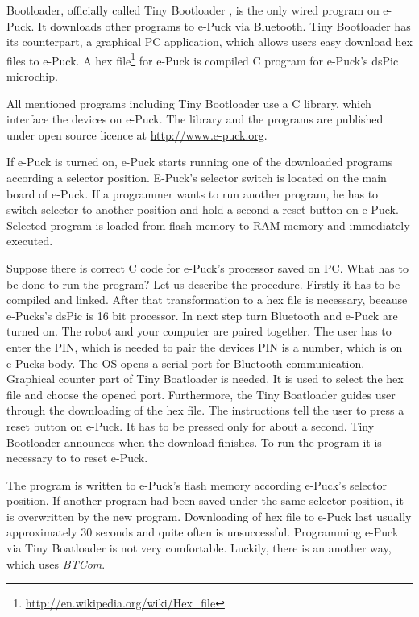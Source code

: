 	Bootloader, officially called Tiny Bootloader\cite{tiny}
	, is the only wired program on e-Puck. It downloads	other programs to e-Puck via Bluetooth. 
	Tiny Bootloader has its counterpart, a graphical PC application,
	which allows users easy download hex files to e-Puck.
	A hex file\footnote{\small{\url{http://en.wikipedia.org/wiki/Hex_file}}} 
	for e-Puck is compiled C program for e-Puck's dsPic microchip. 
	 
	All mentioned programs including Tiny Bootloader use a C library, which interface the devices on e-Puck. 
	The library and the programs are published under open source licence at
	\url{http://www.e-puck.org}.

	 
	If e-Puck is turned on, e-Puck starts running one of the downloaded programs according a selector 
	position. E-Puck's selector switch is located on the main board of e-Puck.
	If a programmer wants to run another program, he has to switch selector to another position
	and hold a second a reset button on e-Puck.	Selected program is loaded from flash memory
	to RAM memory and immediately executed.	
	 
	Suppose there is correct C code for e-Puck's processor saved on PC. What has to be done to run the program?
	Let us describe the procedure.
	Firstly it has to be compiled and linked. After that transformation to a hex file is necessary,
	because e-Pucks's dsPic is 16 bit processor. In next step turn Bluetooth and e-Puck are turned on. 
	The robot and your computer are paired together. The user has to enter the PIN, 
 	which is needed to pair the devices 
	PIN is a number, which is on e-Pucks body.
	The OS opens a serial port for Bluetooth communication.
	Graphical counter part of Tiny Boatloader is needed. It is used to select the hex file and choose the opened port. 
	Furthermore, the Tiny Boatloader guides user through the downloading of the hex file.
	The instructions tell the user to press a reset button on e-Puck. It has to be pressed only for about a second.
	Tiny Bootloader announces when the download finishes. To run the program it is necessary to to reset e-Puck.
	 
	The program is written to e-Puck's flash memory according e-Puck's selector position.
	If another program had been saved under the same selector position, it is overwritten by the new program.
	Downloading of hex file to e-Puck last usually approximately 30 seconds and quite often is unsuccessful. 
	Programming e-Puck via Tiny Boatloader is not very comfortable. 
	Luckily, there is an another way, which uses {\it BTCom}. 

